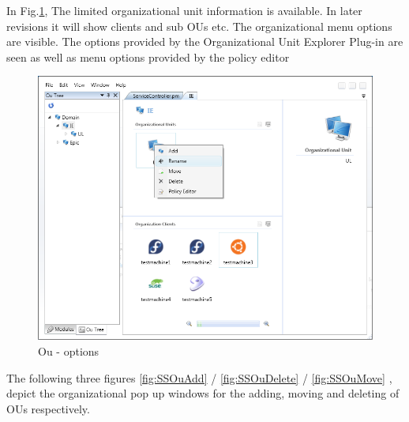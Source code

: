 	\newpage
		
	\normalsize
	{
		In Fig.\ref{fig:SSOuMenuOptions}, The limited organizational unit information is available.
		In later revisions it will show clients and sub OUs etc. The organizational menu options are visible.
		The options provided by the Organizational Unit Explorer Plug-in are seen as well as 
		menu options provided by the policy editor
		\newline			
	}
	
	\begin{figure}[h!]
		\centering
		\includegraphics[scale=0.6]{pages/appendix3/figures/lgpscreens/ou-menu-options.png}
		\caption{Ou - options}
		\label{fig:SSOuMenuOptions}
	\end{figure}
	
	\normalsize
	{
		The following three figures \ref{fig:SSOuAdd} / \ref{fig:SSOuDelete} / \ref{fig:SSOuMove} , 
		depict the organizational pop up windows for the adding, moving and deleting of OUs respectively.	
	}
	

